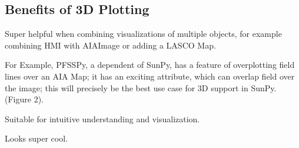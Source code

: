 \subsection{Benefits of 3D Plotting} \label{sec:benefits_of_3d_plot}
    \begin{focus}
        \item Super helpful when combining visualizations of multiple objects, for example combining HMI with AIAImage or adding a LASCO Map.
        \item For Example, PFSSPy, a dependent of SunPy, has a feature of overplotting field lines over an AIA Map; it has an exciting attribute, which can overlap field over the image; this will precisely be the best use case for 3D support in SunPy.  (Figure 2).
        \item Suitable for intuitive understanding and visualization.
        \item Looks super cool.
    \end{focus}

